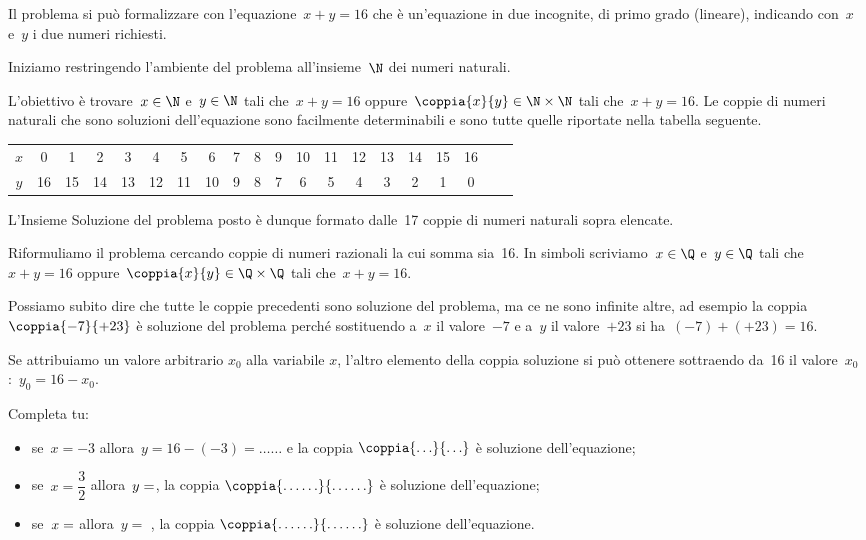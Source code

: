\begin{soluzione}
Il problema si può formalizzare con l'equazione~\(x+y=16\) che è 
un'equazione in due incognite, di primo grado (lineare), 
indicando con~\(x\) e~\(y\) i due numeri richiesti.

Iniziamo restringendo l'ambiente del problema all'insieme~\(\N\) dei numeri 
naturali.

L'obiettivo è trovare~\(x\in\N\) e~\(y\in\N\) tali che~\(x+y=16\) 
oppure~\(\coppia{x}{y}\in\N\times\N\) tali che~\(x+y=16\).
Le coppie di numeri naturali che sono soluzioni
dell'equazione sono facilmente determinabili e sono
tutte quelle riportate nella tabella seguente.

\begin{tabular}{cccccccccccccccccccc}
\toprule
\(x\) & 0 & 1 & 2 & 3 & 4 & 5 & 6 & 7 & 8 & 9 & 10 & 11 & 12 & 13 & 
14 & 15 & 16\\
\(y\) & 16 & 15 & 14 & 13 & 12 & 11 & 10 & 9 & 8 & 7 & 6 & 5 & 4 & 3 & 
2 & 1 & 0\\
\bottomrule
\end{tabular}

L'Insieme Soluzione del problema posto è dunque
formato dalle~17 coppie di numeri naturali sopra elencate.

Riformuliamo il problema cercando coppie di numeri razionali la cui
somma sia~16.
In simboli scriviamo~\(x\in\Q\) e~\(y\in\Q\) tali che~\(x+y=16\) 
oppure~\(\coppia{x}{y}\in\Q\times\Q\) tali che~\(x+y=16\).

Possiamo subito dire che tutte le coppie precedenti sono soluzione del
problema, ma ce ne sono infinite altre, ad esempio la 
coppia~\(\coppia{-7}{+23}\) è 
soluzione del problema perché sostituendo a~\(x\) il
valore~\(-7\) e a~\(y\) il valore~\(+23\) si ha~\((-7)+(+23)=16\).

Se attribuiamo un valore arbitrario \(x_0\) alla variabile \(x\), l'altro
elemento della coppia soluzione si può ottenere sottraendo da~16 il
valore~\(x_0\):~\(y_0=16-x_0\).

Completa tu:

\begin{itemize} [nosep]
\item se~\(x=-3\) allora~\(y=16-(-3)=\ldots\ldots\) e la coppia 
\(\coppia{\ldots}{\ldots}\) è soluzione dell'equazione;
\item se~\(x=\dfrac{3}{2}\) allora~\(y =\dotfill\), la coppia 
\(\coppia{\ldots\ldots}{\ldots\ldots}\) è soluzione dell'equazione;
\item se~\(x =\dotfill\) allora~\(y=\) \dotfill, la coppia 
\(\coppia{\ldots\ldots}{\ldots\ldots}\) è soluzione dell'equazione.
\end{itemize}


\end{soluzione}
